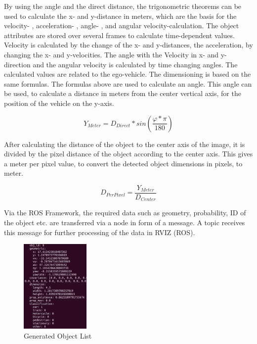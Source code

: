 By using the angle and the direct distance, the trigonometric theorems can be used to calculate the x- and y-distance in meters, which are the basis for the velocity- , acceleration- , angle- , and angular velocity-calculation. The object attributes are stored over several frames to calculate time-dependent values. Velocity is calculated by the change of the x- and y-distances, the acceleration, by changing the x- and y-velocities. The angle with the Velocity in x- and y-direction and the angular velocity is calculated by time changing angles. The calculated values are related to the ego-vehicle.
The dimensioning is based on the same formulas. The formulas above are used to calculate an angle. This angle can be used, to calculate a distance in meters from the center vertical axis, for the position of the vehicle on the y-axis.

\begin{equation}
	Y_{Meter} = D_{Direct} * sin(\frac{\varphi * \pi}{180})
\end{equation}

After calculating the distance of the object to the center axis of the image, it is divided by the pixel distance of the object according to the center axis. This gives a meter per pixel value, to convert the detected object dimensions in pixels, to meter.

\begin{equation}
	D_{PerPixel} = \frac{Y_{Meter}}{D_{Center}}
\end{equation}

Via the \ac{ROS} Framework, the required data such as geometry, probability, \ac{ID} of the object etc. are transferred via a node in form of a message. A topic receives this message for further processing of the data in \ac{RVIZ} (\ac{ROS}).

\begin{figure}[h]
	\centering
	\includegraphics[width=0.3\textwidth]{images/objlist_output.png}
	\caption{Generated Object List}
	\label{fig:ros_outout}
\end{figure}